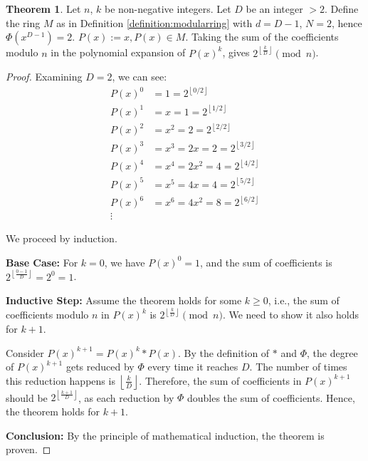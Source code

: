 \documentclass{article}
\theoremstyle{plain}
\theoremstyle{definition}
\newtheorem{theorem}{Theorem}
\newcommand{\redu}{\Phi}
\begin{document}
\begin{theorem} \label{theorem:2}
Let $n$, $k$ be non-negative integers. Let $D$ be an integer $>2$. Define the ring $M$ as in Definition \ref{definition:modularring} with $d=D-1$, $N=2$, hence $\redu(x^{D-1}) = 2$. $P(x) := x, P(x) \in M$. Taking the sum of the coefficients modulo $n$ in the polynomial expansion of \( P(x)^k \), gives $2^{\left\lfloor \frac{k}{D} \right\rfloor} \pmod{n}$.
\end{theorem}
\begin{proof}
Examining $D = 2$, we can see:
\begin{align*}
P(x)^0 &= 1 = 2^{\left\lfloor 0/2 \right\rfloor} \\
P(x)^1 &= x = 1 = 2^{\left\lfloor 1/2 \right\rfloor} \\
P(x)^2 &= x^2 = 2 = 2^{\left\lfloor 2/2 \right\rfloor}\\
P(x)^3 &= x^3 = 2x = 2 = 2^{\left\lfloor 3/2 \right\rfloor}\\
P(x)^4 &= x^4 = 2x^2 = 4 = 2^{\left\lfloor 4/2 \right\rfloor}\\
P(x)^5 &= x^5 = 4x = 4 = 2^{\left\lfloor 5/2 \right\rfloor}\\
P(x)^6 &= x^6 = 4x^2 = 8 = 2^{\left\lfloor 6/2 \right\rfloor}\\
\vdots
\end{align*}

We proceed by induction.

\textbf{Base Case:}
For \( k = 0 \), we have \( P(x)^0 = 1 \), and the sum of coefficients is \( 2^{\left\lfloor \frac{0-1}{D} \right\rfloor} = 2^{0} = 1 \).

\textbf{Inductive Step:}
Assume the theorem holds for some \( k \geq 0 \), i.e., the sum of coefficients modulo \( n \) in \( P(x)^k \) is \( 2^{\left\lfloor \frac{k}{D} \right\rfloor} \pmod{n} \). We need to show it also holds for \( k+1 \).

Consider \( P(x)^{k+1} = P(x)^k \ast P(x) \). By the definition of \( \ast \) and \( \redu \), the degree of \( P(x)^{k+1} \) gets reduced by \( \redu \) every time it reaches \( D \). The number of times this reduction happens is \( \left\lfloor \frac{k}{D} \right\rfloor \). Therefore, the sum of coefficients in \( P(x)^{k+1} \) should be \( 2^{\left\lfloor \frac{k+1}{D} \right\rfloor} \), as each reduction by \( \redu \) doubles the sum of coefficients. Hence, the theorem holds for \( k+1 \).

\textbf{Conclusion:}
By the principle of mathematical induction, the theorem is proven.
\end{proof}
\end{document}
